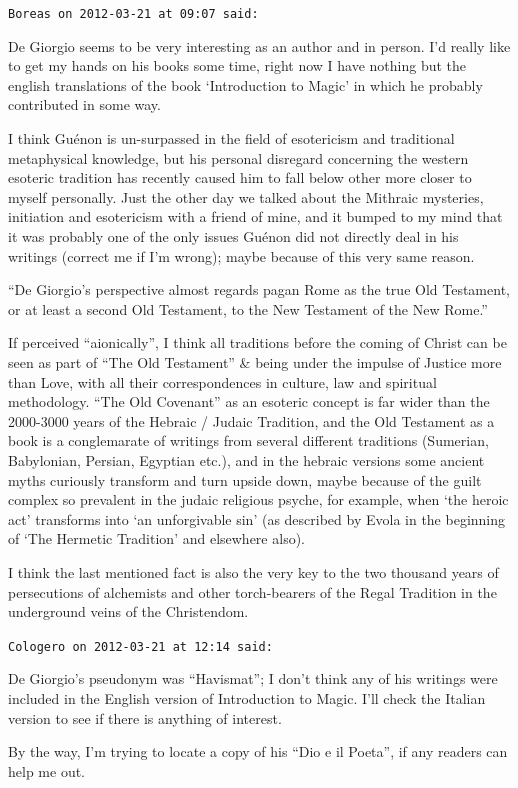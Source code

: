\begin{footnotesize}
\begin{sffamily}
\texttt{Boreas on 2012-03-21 at 09:07 said:}

De Giorgio seems to be very interesting as an author and in person. I'd really like to get my hands on his books some time, right now I have nothing but the english translations of the book `Introduction to Magic' in which he probably contributed in some way.

I think Guénon is un-surpassed in the field of esotericism and traditional metaphysical knowledge, but his personal disregard concerning the western esoteric tradition has recently caused him to fall below other more closer to myself personally. Just the other day we talked about the Mithraic mysteries, initiation and esotericism with a friend of mine, and it bumped to my mind that it was probably one of the only issues Guénon did not directly deal in his writings (correct me if I'm wrong); maybe because of this very same reason.

``De Giorgio's perspective almost regards pagan Rome as the true Old Testament, or at least a second Old Testament, to the New Testament of the New Rome.''

If perceived ``aionically'', I think all traditions before the coming of Christ can be seen as part of ``The Old Testament'' \& being under the impulse of Justice more than Love, with all their correspondences in culture, law and spiritual methodology. ``The Old Covenant'' as an esoteric concept is far wider than the 2000-3000 years of the Hebraic / Judaic Tradition, and the Old Testament as a book is a conglemarate of writings from several different traditions (Sumerian, Babylonian, Persian, Egyptian etc.), and in the hebraic versions some ancient myths curiously transform and turn upside down, maybe because of the guilt complex so prevalent in the judaic religious psyche, for example, when `the heroic act' transforms into `an unforgivable sin' (as described by Evola in the beginning of `The Hermetic Tradition' and elsewhere also).

I think the last mentioned fact is also the very key to the two thousand years of persecutions of alchemists and other torch-bearers of the Regal Tradition in the underground veins of the Christendom.

\hfill

\texttt{Cologero on 2012-03-21 at 12:14 said:}

De Giorgio's pseudonym was ``Havismat''; I don't think any of his writings were included in the English version of Introduction to Magic. I'll check the Italian version to see if there is anything of interest.

By the way, I'm trying to locate a copy of his ``Dio e il Poeta'', if any readers can help me out.

\hfill

\end{sffamily}
\end{footnotesize}

